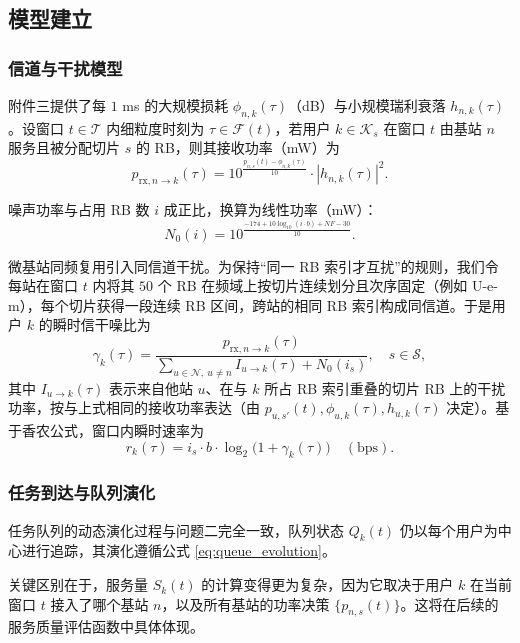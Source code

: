 \subsection{模型建立}

\subsubsection{信道与干扰模型}

附件三提供了每 $1$ ms 的大规模损耗 $\phi_{n,k}(\tau)$（dB）与小规模瑞利衰落 $h_{n,k}(\tau)$。设窗口 $t\in\mathcal{T}$ 内细粒度时刻为 $\tau\in\mathcal{F}(t)$，若用户 $k\in\mathcal{K}_s$ 在窗口 $t$ 由基站 $n$ 服务且被分配切片 $s$ 的 RB，则其接收功率（mW）为
\begin{equation}
 p_{\mathrm{rx},n\to k}(\tau)=10^{\frac{p_{n,s}(t)-\phi_{n,k}(\tau)}{10}}\cdot |h_{n,k}(\tau)|^2.
\end{equation}

噪声功率与占用 RB 数 $i$ 成正比，换算为线性功率（mW）：
\begin{equation}
 N_0(i)=10^{\frac{-174+10\log_{10}(i\cdot b)+NF-30}{10}}.
\end{equation}

微基站同频复用引入同信道干扰。为保持“同一 RB 索引才互扰”的规则，我们令每站在窗口 $t$ 内将其 $50$ 个 RB 在频域上按切片连续划分且次序固定（例如 U-e-m），每个切片获得一段连续 RB 区间，跨站的相同 RB 索引构成同信道。于是用户 $k$ 的瞬时信干噪比为
\begin{equation}
 \gamma_k(\tau)=\frac{p_{\mathrm{rx},n\to k}(\tau)}{\sum\limits_{u\in\mathcal{N},\ u\neq n} I_{u\to k}(\tau)+N_0(i_s)},\quad s\in\mathcal{S},
\end{equation}
其中 $I_{u\to k}(\tau)$ 表示来自他站 $u$、在与 $k$ 所占 RB 索引重叠的切片 RB 上的干扰功率，按与上式相同的接收功率表达（由 $p_{u,s'}(t),\phi_{u,k}(\tau),h_{u,k}(\tau)$ 决定）。基于香农公式，窗口内瞬时速率为
\begin{equation}
 r_k(\tau)=i_s\cdot b\cdot \log_2\big(1+\gamma_k(\tau)\big)\quad(\mathrm{bps}).
\end{equation}
\subsubsection{任务到达与队列演化}

任务队列的动态演化过程与问题二完全一致，队列状态 $Q_k(t)$ 仍以每个用户为中心进行追踪，其演化遵循公式 \eqref{eq:queue_evolution}。

关键区别在于，服务量 $S_k(t)$ 的计算变得更为复杂，因为它取决于用户 $k$ 在当前窗口 $t$ 接入了哪个基站 $n$，以及所有基站的功率决策 $\{p_{n,s}(t)\}$。这将在后续的服务质量评估函数中具体体现。


